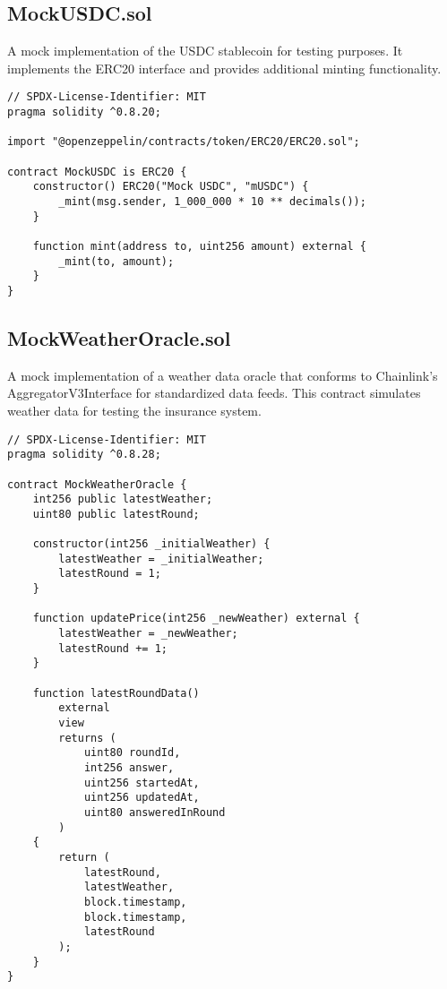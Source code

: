 	\subsection{MockUSDC.sol}\label{subsec:mock-usdc}
	A mock implementation of the USDC stablecoin for testing purposes. It implements the ERC20 interface and provides additional minting functionality.

	\begin{lstlisting}[style=soliditystyle, caption={MockUSDC.sol - Mock Stablecoin for Testing}]
// SPDX-License-Identifier: MIT
pragma solidity ^0.8.20;

import "@openzeppelin/contracts/token/ERC20/ERC20.sol";

contract MockUSDC is ERC20 {
    constructor() ERC20("Mock USDC", "mUSDC") {
        _mint(msg.sender, 1_000_000 * 10 ** decimals());
    }

    function mint(address to, uint256 amount) external {
        _mint(to, amount);
    }
}
\end{lstlisting}

	\subsection{MockWeatherOracle.sol}\label{subsec:mock-weather-oracle}
	A mock implementation of a weather data oracle that conforms to Chainlink's AggregatorV3Interface for standardized data feeds. This contract simulates weather data for testing the insurance system.

	\begin{lstlisting}[style=soliditystyle, caption={MockWeatherOracle.sol - Mock Weather Data Oracle}]
// SPDX-License-Identifier: MIT
pragma solidity ^0.8.28;

contract MockWeatherOracle {
    int256 public latestWeather;
    uint80 public latestRound;

    constructor(int256 _initialWeather) {
        latestWeather = _initialWeather;
        latestRound = 1;
    }

    function updatePrice(int256 _newWeather) external {
        latestWeather = _newWeather;
        latestRound += 1;
    }

    function latestRoundData()
        external
        view
        returns (
            uint80 roundId,
            int256 answer,
            uint256 startedAt,
            uint256 updatedAt,
            uint80 answeredInRound
        )
    {
        return (
            latestRound,
            latestWeather,
            block.timestamp,
            block.timestamp,
            latestRound
        );
    }
}
\end{lstlisting}